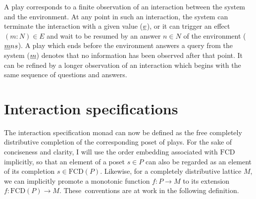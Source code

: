 \documentclass[11pt,oneside]{book}
\theoremstyle{definition}
\newcommand{\ul}[1]{%
  \underline{\smash{#1}}
}
\begin{document}
A play corresponds to a finite observation of
an interaction between the system and the environment.
At any point in such an interaction,
the system can terminate the interaction with a given value ($\ul{v}$),
or it can trigger an effect $(m \mathbin: N) \in E$ and
wait to be resumed by
an answer $n \in N$ of the environment
($\ul{m} n s$).
%
A play which ends before
the environment answers a query from the system ($\ul{m}$)
denotes that no information has been observed after that point.
It can be refined by a longer observation
of an interaction which begins with the same sequence of
questions and answers.

%
%


\section{Interaction specifications} %

The interaction specification monad
can now be defined as the free completely distributive completion
of the corresponding poset of plays.
For the sake of conciseness and clarity,
I will use the order embedding associated with $\mathrm{FCD}$
implicitly,
so that an element of a poset $s \in P$
can also be regarded as an element of
its completion $s \in \mathrm{FCD}(P)$.
Likewise,
for a completely distributive lattice $M$,
we can implicitly
promote a monotonic function
$f : P \rightarrow M$
to its extension
$f : \mathrm{FCD}(P) \rightarrow M$.
These~conventions are at work
in the following definition.
\end{document}

